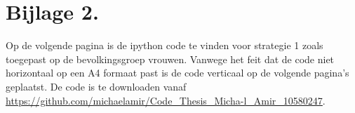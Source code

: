 \newpage
\section{Bijlage 2.}
\label{b2}

Op de volgende pagina is de ipython code te vinden voor strategie 1 zoals toegepast op de bevolkingsgroep vrouwen. Vanwege het feit dat de code niet horizontaal op een A4 formaat past is de code verticaal op de volgende pagina's geplaatst. De code is te downloaden vanaf \url{https://github.com/michaelamir/Code_Thesis_Micha-l_Amir_10580247}. 


\newpage